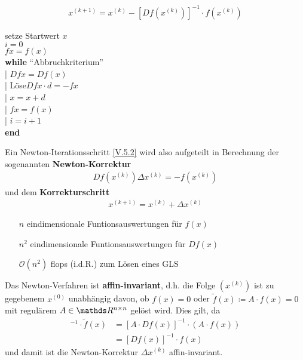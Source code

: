 \begin{gather}
  x^{(k+1)} = x^{(k)} -[Df(x^{(k)})]^{-1}\cdot f(x^{(k)})
  \label{V.5.2}
\end{gather}

\begin{pseudocode}{0.5\linewidth}
  setze Startwert $x$ \\
  $i=0$ \\
  $fx= f(x)$ \\
  \textbf{while} \enquote{Abbruchkriterium} \\
  |	\> $Dfx = Df(x)$ \\
  |	\> Löse\footnotemark $Dfx\cdot d=-fx$ \\
  |	\> $x=x+d$ \\
  |	\> $fx=f(x)$\\
  |	\> $i=i+1$\\
  \textbf{end}
\end{pseudocode}

\begin{Beme}
  Ein Newton-Iterationsschritt \eqref{V.5.2} wird also aufgeteilt in Berechnung
  der sogenannten \textbf{Newton-Korrektur}
  \begin{gather}
    Df(x^{(k)})\Delta x^{(k)} = -f(x^{(k)}) \label{V.5.3}
  \end{gather}
  und dem \textbf{Korrekturschritt}
  \begin{gather}
    x^{(k+1)}= x^{(k)}+\Delta x^{(k)} \label{V.5.4}
  \end{gather}
\end{Beme}


\begin{itemize}
\item[\textbf{$n$}] eindimensionale Funtionsauswertungen für $f(x)$
\item[\textbf{$n^2$}] eindimensionale Funtionsauswertungen für $Df(x)$
\item[$\mathcal{O}(n^2)$] flops (i.d.R.) zum Lösen eines GLS
\end{itemize}


\begin{Beme}
  \label{5.5.5}
  Das Newton-Verfahren ist \textbf{affin-invariant},
  d.h. die Folge $(x^{(k)})$ ist zu gegebenem $x^{(0)}$ unabhängig davon,
  ob $f(x)=0$ oder $\widetilde{f}(x)\coloneqq A\cdot f(x) =0$
  mit regulärem $A\in \Renn $ gelöst wird.
  Dies gilt, da 
  \begin{align*}
    [D\widetilde{f}(x)]^{-1} \cdot \widetilde{f}(x)
    &= [A\cdot Df(x)]^{-1} \cdot (A\cdot f(x))\\
    &= [Df(x)]^{-1} \cdot f(x)
  \end{align*}
  und damit ist die Newton-Korrektur $\Delta x^{(k)}$ affin-invariant.
\end{Beme}

